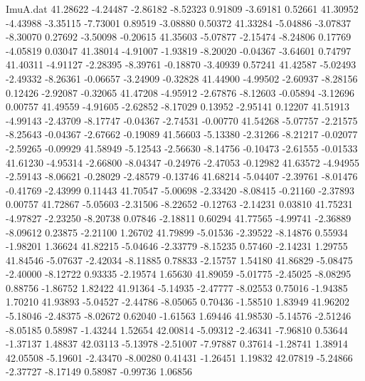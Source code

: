 \begin{filecontents}{ImuA.dat}
  41.28622   -4.24487   -2.86182   -8.52323    0.91809   -3.69181    0.52661
  41.30952   -4.43988   -3.35115   -7.73001    0.89519   -3.08880    0.50372
  41.33284   -5.04886   -3.07837   -8.30070    0.27692   -3.50098   -0.20615
  41.35603   -5.07877   -2.15474   -8.24806    0.17769   -4.05819    0.03047
  41.38014   -4.91007   -1.93819   -8.20020   -0.04367   -3.64601    0.74797
  41.40311   -4.91127   -2.28395   -8.39761   -0.18870   -3.40939    0.57241
  41.42587   -5.02493   -2.49332   -8.26361   -0.06657   -3.24909   -0.32828
  41.44900   -4.99502   -2.60937   -8.28156    0.12426   -2.92087   -0.32065
  41.47208   -4.95912   -2.67876   -8.12603   -0.05894   -3.12696    0.00757
  41.49559   -4.91605   -2.62852   -8.17029    0.13952   -2.95141    0.12207
  41.51913   -4.99143   -2.43709   -8.17747   -0.04367   -2.74531   -0.00770
  41.54268   -5.07757   -2.21575   -8.25643   -0.04367   -2.67662   -0.19089
  41.56603   -5.13380   -2.31266   -8.21217   -0.02077   -2.59265   -0.09929
  41.58949   -5.12543   -2.56630   -8.14756   -0.10473   -2.61555   -0.01533
  41.61230   -4.95314   -2.66800   -8.04347   -0.24976   -2.47053   -0.12982
  41.63572   -4.94955   -2.59143   -8.06621   -0.28029   -2.48579   -0.13746
  41.68214   -5.04407   -2.39761   -8.01476   -0.41769   -2.43999    0.11443
  41.70547   -5.00698   -2.33420   -8.08415   -0.21160   -2.37893    0.00757
  41.72867   -5.05603   -2.31506   -8.22652   -0.12763   -2.14231    0.03810
  41.75231   -4.97827   -2.23250   -8.20738    0.07846   -2.18811    0.60294
  41.77565   -4.99741   -2.36889   -8.09612    0.23875   -2.21100    1.26702
  41.79899   -5.01536   -2.39522   -8.14876    0.55934   -1.98201    1.36624
  41.82215   -5.04646   -2.33779   -8.15235    0.57460   -2.14231    1.29755
  41.84546   -5.07637   -2.42034   -8.11885    0.78833   -2.15757    1.54180
  41.86829   -5.08475   -2.40000   -8.12722    0.93335   -2.19574    1.65630
  41.89059   -5.01775   -2.45025   -8.08295    0.88756   -1.86752    1.82422
  41.91364   -5.14935   -2.47777   -8.02553    0.75016   -1.94385    1.70210
  41.93893   -5.04527   -2.44786   -8.05065    0.70436   -1.58510    1.83949
  41.96202   -5.18046   -2.48375   -8.02672    0.62040   -1.61563    1.69446
  41.98530   -5.14576   -2.51246   -8.05185    0.58987   -1.43244    1.52654
  42.00814   -5.09312   -2.46341   -7.96810    0.53644   -1.37137    1.48837
  42.03113   -5.13978   -2.51007   -7.97887    0.37614   -1.28741    1.38914
  42.05508   -5.19601   -2.43470   -8.00280    0.41431   -1.26451    1.19832
  42.07819   -5.24866   -2.37727   -8.17149    0.58987   -0.99736    1.06856

\end{filecontents}
